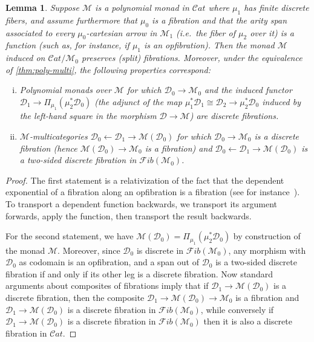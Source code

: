 \documentclass{article}
\newtheorem{lem}[thm]{Lemma}
\theoremstyle{definition}
\theoremstyle{remark}
\def\M{\mathcal{M}}
\def\Cat{\mathcal{C}\mathit{at}}
\def\Fib{\mathcal{F}\mathit{ib}}
\def\D{\mathcal{D}}
\begin{document}
\begin{lem}\label{thm:poly-multi-2}
  Suppose $\M$ is a polynomial monad in $\Cat$ where $\mu_1$ has finite discrete fibers, and assume furthermore that $\mu_0$ is a fibration and that the arity span associated to every $\mu_0$-cartesian arrow in $\M_1$ (i.e.\ the fiber of $\mu_2$ over it) is a function (such as, for instance, if $\mu_1$ is an opfibration).
  Then the monad $\M$ induced on $\Cat/\M_0$ preserves (split) fibrations.
  Moreover, under the equivalence of \cref{thm:poly-multi}, the following properties correspond:
  \begin{enumerate}[(i)]
  \item Polynomial monads over $\M$ for which $\D_0\to\M_0$ and the induced functor $\D_1\to \Pi_{\mu_1} (\mu_2^* \D_0)$ (the adjunct of the map $\mu_1^* \D_1 \cong \D_2 \to \mu_2 ^* \D_0$ induced by the left-hand square in the morphism $\D\to \M$) are discrete fibrations.\label{item:pm1}
  \item $\M$-multicategories $\D_0 \leftarrow \D_1 \to \M(\D_0)$ for which $\D_0\to \M_0$ is a discrete fibration (hence $\M(\D_0)\to\M_0$ is a fibration) and $\D_0 \leftarrow \D_1 \to \M(\D_0)$ is a two-sided discrete fibration in $\Fib (\M_0)$.\label{item:pm2}
  \end{enumerate}
\end{lem}
\begin{proof}
  The first statement is a relativization of the fact that the dependent exponential of a fibration along an opfibration is a fibration (see for instance~\cite[Lemma 4.4.2]{weber:poly-pb}).
  To transport a dependent function backwards, we transport its argument forwards, apply the function, then transport the result backwards.

  For the second statement, we have $\M(\D_0) = \Pi_{\mu_1} (\mu_2^* \D_0)$ by construction of the monad $\M$.
  Moreover, since $\D_0$ is discrete in $\Fib(\M_0)$, any morphism with $\D_0$ as codomain is an opfibration, and a span out of $\D_0$ is a two-sided discrete fibration if and only if its other leg is a discrete fibration.
  Now standard arguments about composites of fibrations imply that if $\D_1 \to \M(\D_0)$ is a discrete fibration, then the composite $\D_1 \to \M(\D_0) \to \M_0$ is a fibration and $\D_1 \to \M(\D_0)$ is a discrete fibration in $\Fib(\M_0)$, while conversely if $\D_1 \to \M(\D_0)$ is a discrete fibration in $\Fib(\M_0)$ then it is also a discrete fibration in $\Cat$.
\end{proof}
\end{document}
